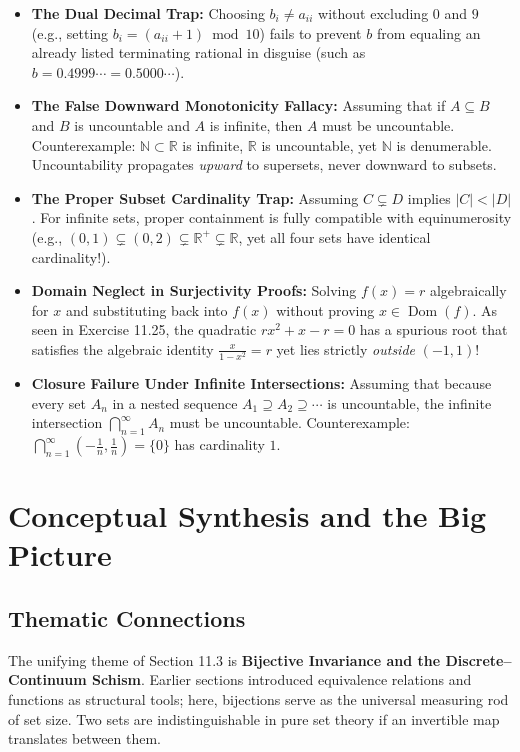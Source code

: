 \documentclass[11pt, letterpaper]{article}
\theoremstyle{definition}
\theoremstyle{remark}
\begin{document}
\begin{itemize}
    \item \textbf{The Dual Decimal Trap:} Choosing $b_i \neq a_{ii}$ without excluding $0$ and $9$ (e.g., setting $b_i = (a_{ii} + 1) \bmod 10$) fails to prevent $b$ from equaling an already listed terminating rational in disguise (such as $b = 0.4999\cdots = 0.5000\cdots$).
    \item \textbf{The False Downward Monotonicity Fallacy:} Assuming that if $A \subseteq B$ and $B$ is uncountable and $A$ is infinite, then $A$ must be uncountable. Counterexample: $\mathbb{N} \subset \mathbb{R}$ is infinite, $\mathbb{R}$ is uncountable, yet $\mathbb{N}$ is denumerable. Uncountability propagates \emph{upward} to supersets, never downward to subsets.
    \item \textbf{The Proper Subset Cardinality Trap:} Assuming $C \subsetneq D$ implies $|C| < |D|$. For infinite sets, proper containment is fully compatible with equinumerosity (e.g., $(0, 1) \subsetneq (0, 2) \subsetneq \mathbb{R}^+ \subsetneq \mathbb{R}$, yet all four sets have identical cardinality!).
    \item \textbf{Domain Neglect in Surjectivity Proofs:} Solving $f(x) = r$ algebraically for $x$ and substituting back into $f(x)$ without proving $x \in \operatorname{Dom}(f)$. As seen in Exercise 11.25, the quadratic $rx^2 + x - r = 0$ has a spurious root that satisfies the algebraic identity $\frac{x}{1-x^2} = r$ yet lies strictly \emph{outside} $(-1, 1)$!
    \item \textbf{Closure Failure Under Infinite Intersections:} Assuming that because every set $A_n$ in a nested sequence $A_1 \supseteq A_2 \supseteq \cdots$ is uncountable, the infinite intersection $\bigcap_{n=1}^{\infty} A_n$ must be uncountable. Counterexample: $\bigcap_{n=1}^{\infty} \left(-\frac{1}{n}, \frac{1}{n}\right) = \{0\}$ has cardinality $1$.
\end{itemize}

\section{Conceptual Synthesis and the Big Picture}

\subsection{Thematic Connections}

The unifying theme of Section 11.3 is \textbf{Bijective Invariance and the Discrete–Continuum Schism}. Earlier sections introduced equivalence relations and functions as structural tools; here, bijections serve as the universal measuring rod of set size. Two sets are indistinguishable in pure set theory if an invertible map translates between them.
\end{document}
